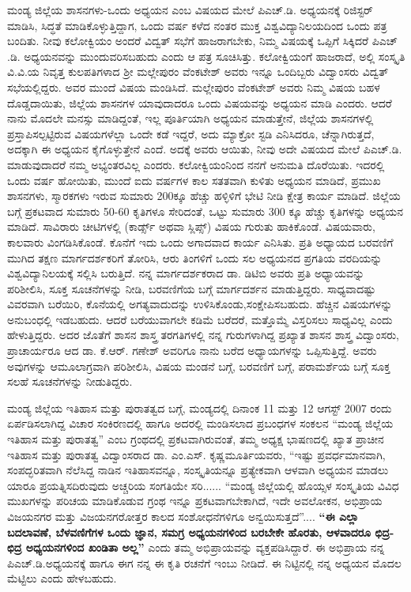 ಮಂಡ್ಯ ಜಿಲ್ಲೆಯ ಶಾಸನಗಳು-ಒಂದು ಅಧ್ಯಯನ ಎಂಬ ವಿಷಯದ ಮೇಲೆ ಪಿಎಚ್​.ಡಿ. ಅಧ್ಯಯನಕ್ಕೆ ರಿಜಿಸ್ಟರ್​ ಮಾಡಿಸಿ, ಸಿದ್ಧತೆ ಮಾಡಿಕೊಳ್ಳುತ್ತಿದ್ದಾಗ, ಒಂದು ವರ್ಷ ಕಳೆದ ನಂತರ ಮುಕ್ತ ವಿಶ್ವವಿದ್ಯಾನಿಲಯದಿಂದ ಒಂದು ಪತ್ರ ಬಂದಿತು. ನೀವು ಕಲೋಕ್ವಿಯಂ ಅಂದರೆ ವಿದ್ವತ್​ ಸಭೆಗೆ ಹಾಜರಾಗಬೇಕು, ನಿಮ್ಮ ವಿಷಯಕ್ಕೆ ಒಪ್ಪಿಗೆ ಸಿಕ್ಕಿದರೆ ಪಿಎಚ್​.ಡಿ. ಅಧ್ಯಯನವನ್ನು ಮುಂದುವರಿಸಬಹುದು ಎಂದು ಆ ಪತ್ರ ಸೂಚಿಸಿತ್ತು. ಕಲೋಕ್ವಿಯಂಗೆ ಹಾಜರಾದೆ, ಅಲ್ಲಿ ಸಂಸ್ಕೃತಿ ವಿ.ವಿ.ಯ ನಿವೃತ್ತ ಕುಲ\-ಪತಿಗಳಾದ ಶ‍್ರೀ ಮಲ್ಲೇಪುರಂ ವೆಂಕಟೇಶ್​ ಅವರು ಇನ್ನೂ ಒಂದಿಬ್ಬರು ವಿದ್ವಾಂಸರು ವಿದ್ವತ್​ ಸಭೆಯಲ್ಲಿದ್ದರು. ಅವರ ಮುಂದೆ ವಿಷಯ ಮಂಡಿಸಿದೆ. ಮಲ್ಲೇಪುರಂ ವೆಂಕಟೇಶ್​ ಅವರು ನಿಮ್ಮ ವಿಷಯ ಬಹಳ ದೊಡ್ಡದಾಯಿತು, ಜಿಲ್ಲೆಯ ಶಾಸನಗಳ ಯಾವುದಾದರೂ ಒಂದು ವಿಷಯವನ್ನು ಅಧ್ಯಯನ ಮಾಡಿ ಎಂದರು. ಆದರೆ ನಾನು ಮೊದಲೇ ಮನಸ್ಸು ಮಾಡಿದ್ದಂತೆ, ಇಲ್ಲ ಪೂರ್ತಿಯಾಗಿ ಅಧ್ಯಯನ ಮಾಡುತ್ತೇನೆ, ಜಿಲ್ಲೆಯ ಶಾಸನಗಳಲ್ಲಿ ಪ್ರಸ್ತಾಪಿಸಲ್ಪಟ್ಟಿರುವ ವಿಷಯಗಳೆಲ್ಲಾ ಒಂದೇ ಕಡೆ ಇದ್ದರೆ, ಅದು ಮ್ಯಾಕ್ರೋ ಸ್ಟಡಿ ಎನಿಸಿದರೂ, ಚೆನ್ನಾಗಿರುತ್ತದೆ, ಅದಕ್ಕಾಗಿ ಈ ಅಧ್ಯಯನ ಕೈಗೊಳ್ಳುತ್ತೇನೆ ಎಂದೆ. ಅದಕ್ಕೆ ಅವರು ಆಯಿತು, ನೀವು ಅದೇ ವಿಷಯದ ಮೇಲೆ ಪಿಎಚ್​.ಡಿ. ಮಾಡುವುದಾದರೆ ನಮ್ಮ ಅಭ್ಯಂತರವಿಲ್ಲ ಎಂದರು. ಕಲೋಕ್ವಿಯಂನಿಂದ ನನಗೆ ಅನುಮತಿ ದೊರೆಯಿತು. ಇದರಲ್ಲಿ ಒಂದು ವರ್ಷ ಹೋಯಿತು, ಮುಂದೆ ಐದು ವರ್ಷಗಳ ಕಾಲ ಸತತವಾಗಿ ಕುಳಿತು ಅಧ್ಯಯನ ಮಾಡಿದೆ, ಪ್ರಮುಖ ಶಾಸನಗಳು, ಸ್ಮಾರಕಗಳು ಇರುವ ಸುಮಾರು 200ಕ್ಕೂ ಹೆಚ್ಚು ಹಳ್ಳಿಳಿಗೆ ಭೇಟಿ ನೀಡಿ ಕ್ಷೇತ್ರ ಕಾರ್ಯ ಮಾಡಿದೆ. ಜಿಲ್ಲೆಯ ಬಗ್ಗೆ ಪ್ರಕಟವಾದ ಸುಮಾರು 50-60 ಕೃತಿಗಳೂ ಸೇರಿದಂತೆ, ಒಟ್ಟು ಸುಮಾರು 300 ಕ್ಕೂ ಹೆಚ್ಚು ಕೃತಿಗಳನ್ನು ಅಧ್ಯಯನ ಮಾಡಿದೆ. ಸಾವಿರಾರು ಚೀಟಿಗಳಲ್ಲಿ (ಕಾರ್ಡ್ಸ್ ಅಥವಾ ಸ್ಲಿಪ್ಸ್​) ವಿಷಯ ಗುರುತು ಹಾಕಿಕೊಂಡೆ. ವಿಷಯವಾರು, ಕಾಲವಾರು ವಿಂಗಡಿಸಿ\-ಕೊಂಡೆ. ಕೊನೆಗೆ ಇದು ಒಂದು ಅಗಾದವಾದ ಕಾರ್ಯ ಎನಿಸಿತು. ಪ್ರತಿ ಅಧ್ಯಾಯದ ಬರವಣಿಗೆ ಮುಗಿದ ತಕ್ಷಣ ಮಾರ್ಗದರ್ಶಕರಿಗೆ ತೋರಿಸಿ, ಆರು ತಿಂಗಳಿಗೆ ಒಂದು ಸಲ ಅಧ್ಯಯನದ ಪ್ರಗತಿಯ ವರದಿಯನ್ನು ವಿಶ್ವವಿದ್ಯಾನಿಲಯಕ್ಕೆ ಸಲ್ಲಿಸಿ ಬರುತ್ತಿದೆ. ನನ್ನ ಮಾರ್ಗದರ್ಶಕರಾದ ಡಾ. ಡಿಟಿಬಿ ಅವರು ಪ್ರತಿ ಅಧ್ಯಾಯವನ್ನು ಪರಿಶೀಲಿಸಿ, ಸೂಕ್ತ ಸೂಚನೆಗಳನ್ನು ನೀಡಿ, ಬರವಣಿಗೆಯ ಬಗ್ಗೆ ಮಾರ್ಗದರ್ಶನ ಮಾಡುತ್ತಿದ್ದರು. ಸಾಧ್ಯವಾದಷ್ಟು ವಿವರವಾಗಿ ಬರೆಯಿರಿ, ಕೊನೆಯಲ್ಲಿ ಅಗತ್ಯವಾದುದನ್ನು ಉಳಿಸಿಕೊಂಡು,\break ಸಂಕ್ಷೇಪಿಸಬಹುದು. ಹೆಚ್ಚಿನ ವಿಷಯಗಳನ್ನು ಅನುಬಂಧಲ್ಲಿ ಇಡಬಹುದು. ಆದರೆ ಬರೆಯುವಾಗಲೇ ಕಡಿಮೆ ಬರೆದರೆ, ಮತ್ತೊಮ್ಮೆ ವಿಸ್ತರಿಸಲು ಸಾಧ್ಯವಿಲ್ಲ ಎಂದು ಹೇಳುತ್ತಿದ್ದರು. ಅದರ ಜೊತೆಗೆ ಶಾಸನ ಶಾಸ್ತ್ರ ತರಗತಿಗಳಲ್ಲಿ ನನ್ನ ಗುರುಗಳಾಗಿದ್ದ ಪ್ರಖ್ಯಾತ ಶಾಸನ ಶಾಸ್ತ್ರ ವಿದ್ವಾಂಸರು, ಪ್ರಾಚಾರ್ಯರೂ ಆದ ಡಾ. ಕೆ.ಆರ್​. ಗಣೇಶ್​ ಅವರಿಗೂ ನಾನು ಬರೆದ ಅಧ್ಯಾಯಗಳನ್ನು ಒಪ್ಪಿಸುತ್ತಿದ್ದೆ. ಅವರು ಅವುಗಳನ್ನು ಆಮೂಲಾಗ್ರವಾಗಿ ಪರಿಶೀಲಿಸಿ, ವಿಷಯ ಮಂಡನೆ ಬಗ್ಗೆ, ಬರವಣಿಗೆ ಬಗ್ಗೆ, ಪರಾಮರ್ಶೆಯ ಬಗ್ಗೆ ಸೂಕ್ತ ಸಲಹೆ ಸೂಚನೆಗಳನ್ನು ನೀಡುತಿದ್ದರು.

ಮಂಡ್ಯ ಜಿಲ್ಲೆಯ ಇತಿಹಾಸ ಮತ್ತು ಪುರಾತತ್ವದ ಬಗ್ಗೆ, ಮಂಡ್ಯದಲ್ಲಿ ದಿನಾಂಕ 11 ಮತ್ತು 12 ಆಗಸ್ಟ್​ 2007 ರಂದು ಏರ್ಪಡಿಸಲಾಗಿದ್ದ ವಿಚಾರ ಸಂಕಿರಣದಲ್ಲಿ ಹಾಗೂ ಅದರಲ್ಲಿ ಮಂಡಿಸಲಾದ ಪ್ರಬಂಧಗಳ ಸಂಕಲನ “ಮಂಡ್ಯ ಜಿಲ್ಲೆಯ ಇತಿಹಾಸ ಮತ್ತು ಪುರಾತತ್ವ” ಎಂಬ ಗ್ರಂಥದಲ್ಲಿ ಪ್ರಕಟವಾಗಿರುವಂತೆ, ತಮ್ಮ ಅಧ್ಯಕ್ಷ ಭಾಷಣದಲ್ಲಿ ಖ್ಯಾತ ಪ್ರಾಚೀನ ಇತಿಹಾಸ ಮತ್ತು ಪುರಾತತ್ವ ವಿದ್ವಾಂಸರಾದ ಡಾ. ಎಂ.ಎಸ್​. ಕೃಷ್ಣಮೂರ್ತಿಯವರು, “ಇಷ್ಟು ಪ್ರವರ್ಧಮಾನವಾಗಿ, ಸಂಪದ್ಭರಿತವಾಗಿ ನೆಲೆಸಿದ್ದ ನಾಡಿನ ಇತಿಹಾಸವನ್ನೂ, ಸಂಸ್ಕೃತಿಯನ್ನೂ ಪ್ರತ್ಯೇಕವಾಗಿ ಆಳವಾಗಿ ಅಧ್ಯಯನ ಮಾಡಲು ಯಾರೂ ಪ್ರಯತ್ನಿಸದಿರುವುದು ಅಚ್ಚರಿಯ ಸಂಗತಿಯೇ ಸರಿ...... “ಮಂಡ್ಯ ಜಿಲ್ಲೆಯಲ್ಲಿ ಹೊಯ್ಸಳ ಸಂಸ್ಕೃತಿಯ ವಿವಿಧ ಮುಖ\-ಗಳನ್ನು ಪರಿಚಯ ಮಾಡಿಕೊಡುವ ಗ್ರಂಥ ಇನ್ನೂ ಪ್ರಕಟವಾಗಬೇಕಾಗಿದೆ, ಇದೇ ಅವಲೋಕನ, ಅಭಿಪ್ರಾಯ ವಿಜಯನಗರ ಮತ್ತು ವಿಜಯನಗರೋತ್ತರ ಕಾಲದ ಸಂಶೋಧನೆಗಳಿಗೂ ಅನ್ವಯಿಸುತ್ತದೆ”.... \textbf{“ಈ ಎಲ್ಲಾ ಬದಲಾವಣೆ, ಬೆಳವಣಿಗೆಗಳ ಒಂದು ಜ್ಞಾನ, ಸಮಗ್ರ ಅಧ್ಯಯನಗಳಿಂದ ಬರಬೇಕೇ ಹೊರತು, ಆಳವಾದರೂ ಛಿದ್ರ-ಛಿದ್ರ ಅಧ್ಯಯನಗಳಿಂದ ಖಂಡಿತಾ ಅಲ್ಲ”} ಎಂದು ತಮ್ಮ ಅಭಿಪ್ರಾಯವನ್ನು ವ್ಯಕ್ತಪಡಿಸಿದ್ದಾರೆ. ಈ ಅಭಿಪ್ರಾಯ ನನ್ನ ಪಿಎಚ್​.ಡಿ.ಅಧ್ಯಯನಕ್ಕೆ ಹಾಗೂ ಈಗ ನನ್ನ ಈ ಕೃತಿ ರಚನೆಗೆ ಇಂಬು ನೀಡಿದೆ. ಈ ನಿಟ್ಟಿನಲ್ಲಿ ನನ್ನ ಅಧ್ಯಯನ ಮೊದಲ ಮೆಟ್ಟಿಲು ಎಂದು ಹೇಳಬಹುದು.

